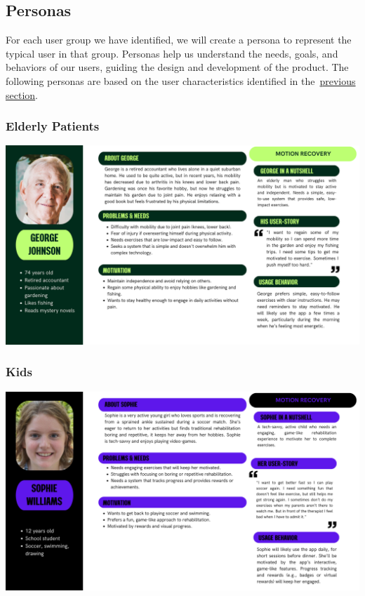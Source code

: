 \subsection{Personas}
    For each user group we have identified, we will create a persona to represent the typical user in that group. 
    Personas help us understand the needs, goals, and behaviors of our users, guiding the design and development of the product.
    The following personas are based on the user characteristics identified in the~\hyperref[subsec:hands_on_users]{previous section}.
    \vfill
    \subsubsection{Elderly Patients}
    \includegraphics[width=\textwidth]{images/personas/patient_elderly.png}
    \subsubsection{Kids}
    \includegraphics[width=\textwidth]{images/personas/patient_kid.png}
    \vfill
